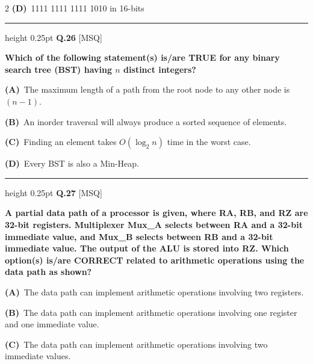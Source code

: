\documentclass[a4paper,10pt,twoside]{article}
\begin{document}
\begin{multicols}{2}
\textbf{(D)}~1111 1111 1111 1010 in 16-bits
\par\vspace{6pt}\hrule height 0.25pt\vspace{6pt}
\noindent\textbf{Q.26} \hfill {\footnotesize\textsf{[MSQ]}}
\par\vspace{2pt}
{\bfseries Which of the following statement(s) is/are TRUE for any binary search tree (BST) having $n$ distinct integers? \par}
\par\vspace{2pt}\noindent
\textbf{(A)}~The maximum length of a path from the root node to any other node is $(n-1)$.\par\vspace{2pt}\noindent
\textbf{(B)}~An inorder traversal will always produce a sorted sequence of elements.\par\vspace{2pt}\noindent
\textbf{(C)}~Finding an element takes $O(\log_2 n)$ time in the worst case.\par\vspace{2pt}\noindent
\textbf{(D)}~Every BST is also a Min-Heap.
\par\vspace{6pt}\hrule height 0.25pt\vspace{6pt}
\noindent\textbf{Q.27} \hfill {\footnotesize\textsf{[MSQ]}}
\par\vspace{2pt}
{\bfseries A partial data path of a processor is given, where RA, RB, and RZ are 32-bit registers. Multiplexer Mux\_A selects between RA and a 32-bit immediate value, and Mux\_B selects between RB and a 32-bit immediate value. The output of the ALU is stored into RZ. Which option(s) is/are CORRECT related to arithmetic operations using the data path as shown? \par}
\par\vspace{2pt}\noindent
\textbf{(A)}~The data path can implement arithmetic operations involving two registers.\par\vspace{2pt}\noindent
\textbf{(B)}~The data path can implement arithmetic operations involving one register and one immediate value.\par\vspace{2pt}\noindent
\textbf{(C)}~The data path can implement arithmetic operations involving two immediate values.\par\vspace{2pt}\noindent

\end{multicols}
\end{document}
